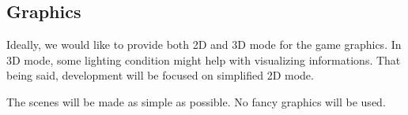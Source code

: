 \subsection{Graphics}
Ideally, we would like to provide both 2D and 3D mode for the game graphics. In 3D mode, some lighting condition might help with visualizing informations. That being said, development will be focused on simplified 2D mode.

The scenes will be made as simple as possible. No fancy graphics will be used.
